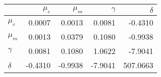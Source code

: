 \begin{tabular}{lrrrr}
\toprule
 & $\mu_c$ & $\mu_m$ & $\gamma$ & $\delta$ \\
\midrule
$\mu_c$ & 0.0007 & 0.0013 & 0.0081 & -0.4310 \\
$\mu_m$ & 0.0013 & 0.0379 & 0.1080 & -0.9938 \\
$\gamma$ & 0.0081 & 0.1080 & 1.0622 & -7.9041 \\
$\delta$ & -0.4310 & -0.9938 & -7.9041 & 507.0663 \\
\bottomrule
\end{tabular}
